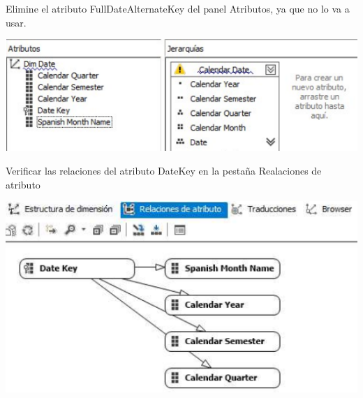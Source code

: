     Elimine el atributo FullDateAlternateKey del panel Atributos, ya que no lo va a usar.
        
	\begin{center}
	\includegraphics[width=0.5\columnwidth]{images/task2/14}
    \end{center}
    
    Verificar las relaciones del atributo DateKey en la pestaña Realaciones de atributo
        
	\begin{center}
	\includegraphics[width=0.5\columnwidth]{images/task2/15}
    \end{center}
